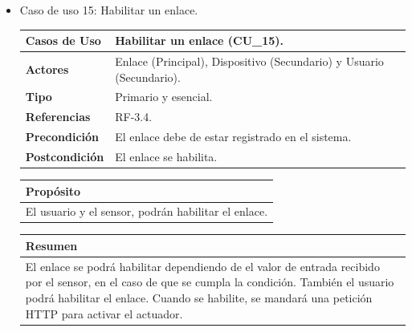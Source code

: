 \begin{itemize}
\begin{table}[h!]
        \caption{Caso de uso 14: Borrar un enlace.}
        \label{table:caso-de-uso-14}
    \end{table}
    
    \newpage
    
    \item Caso de uso 15: Habilitar un enlace.
    
    \begin{table}[h!]
        \centering
        \begin{tabular}{|l|p{}|}
            \hline
            \textbf{Casos de Uso}   &   Habilitar un enlace (CU\_15). \\
            \hline 
            \textbf{Actores}        &   Enlace (Principal), Dispositivo (Secundario) y Usuario (Secundario). \\ 
            \hline 
            \textbf{Tipo}           &   Primario y esencial. \\ 
            \hline
            \textbf{Referencias}    &   RF-3.4. \\ 
            \hline
            \textbf{Precondición}   &   El enlace debe de estar registrado en el sistema. \\ 
            \hline
            \textbf{Postcondición}  &   El enlace se habilita. \\ 
            \hline
        \end{tabular}
        
        \vspace{5mm}
        
        \begin{tabular}{|p{\textwidth}|}
            \hline
            \rowcolor{SeaGreen} \textbf{Propósito} \\
            \hline
            \multicolumn{1}{|p{12cm}|}{El usuario y el sensor, podrán habilitar el enlace.} \\ [0.5ex]
            \hline
        \end{tabular}
        
        \vspace{5mm}
        
        \begin{tabular}{|p{\textwidth}|}
            \hline
            \rowcolor{SeaGreen} \textbf{Resumen} \\
            \hline
            \multicolumn{1}{|p{12cm}|}{El enlace se podrá habilitar dependiendo de el valor de entrada recibido por el
            sensor, en el caso de que se cumpla la condición. También el usuario podrá habilitar el enlace. Cuando se 
            habilite, se mandará una petición HTTP para activar el actuador.} \\ [0.5ex]
            \hline
        \end{tabular}
        

\end{table}
\end{itemize}
